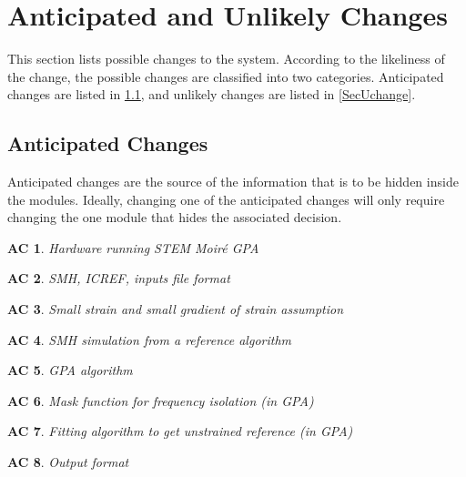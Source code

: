 \documentclass[12pt, titlepage]{article}
\newcommand{\progname}{STEM Moir{\'e} GPA}
\newtheorem{AC}{AC}
\begin{document}
\section{Anticipated and Unlikely Changes} \label{SecChange}

This section lists possible changes to the system. According to the likeliness
of the change, the possible changes are classified into two
categories. Anticipated changes are listed in \cref{SecAchange}, and
unlikely changes are listed in \cref{SecUchange}.

\subsection{Anticipated Changes} \label{SecAchange}

Anticipated changes are the source of the information that is to be hidden
inside the modules. Ideally, changing one of the anticipated changes will only
require changing the one module that hides the associated decision. 

\begin{AC}\normalfont Hardware running \progname{}
\label{AC_Hardware}
\end{AC}

\begin{AC}\normalfont SMH, ICREF, inputs file format
\label{AC_FormatFile}
\end{AC}

\begin{AC}\normalfont Small strain and small gradient of strain assumption
\label{AC_Assum_SmallStrain}
\end{AC}

\begin{AC}\normalfont SMH simulation from a reference algorithm
\label{AC_Assum_2DPeriodicGrid}
\end{AC}

\begin{AC}\normalfont GPA algorithm
\label{AC_GPA_algo}
\end{AC}

\begin{AC}\normalfont Mask function for frequency isolation (in GPA)
\label{AC_GPA_mask}
\end{AC}

\begin{AC}\normalfont Fitting algorithm to get unstrained reference (in GPA)
\label{AC_GPA_RefFit}
\end{AC}

\begin{AC}\normalfont Output format
\label{AC_Export}
\end{AC}
\end{document}
